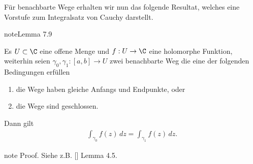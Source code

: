 \documentclass[letterpaper,10pt,german]{jupyterBook}
\begin{document}
\sphinxAtStartPar
Für benachbarte Wege erhalten wir nun das folgende Resultat, welches eine Vorstufe zum Integralsatz von Cauchy darstellt.
\label{complexanalysis/cauchyintegral:lem:closepath}
\begin{sphinxadmonition}{note}{Lemma 7.9}



\sphinxAtStartPar
Es \(U\subset\C\) eine offene Menge und \(f:U\to\C\) eine holomorphe Funktion, weiterhin seien \(\gamma_0,\gamma_1:[a,b]\to U\) zwei benachbarte Weg die eine der folgenden Bedingungen erfüllen
\begin{enumerate}
%
\item {} 
\sphinxAtStartPar
die Wege haben gleiche Anfangs\sphinxhyphen{} und Endpunkte, oder

\item {} 
\sphinxAtStartPar
die Wege sind geschlossen.

\end{enumerate}

\sphinxAtStartPar
Dann gilt
\begin{equation*}
\begin{split}\int_{\gamma_0} f(z)\, dz = \int_{\gamma_1} f(z)\, dz.\end{split}
\end{equation*}\end{sphinxadmonition}

\begin{sphinxadmonition}{note}
\sphinxAtStartPar
Proof. Siehe z.B. {[}{]} Lemma 4.5.
\end{sphinxadmonition}
\end{document}
